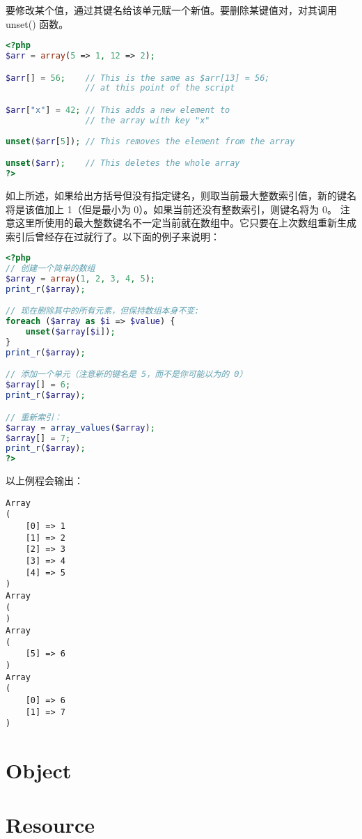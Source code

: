 要修改某个值，通过其键名给该单元赋一个新值。要删除某键值对，对其调用 unset() 函数。


\begin{lstlisting}[language=PHP]
<?php
$arr = array(5 => 1, 12 => 2);

$arr[] = 56;    // This is the same as $arr[13] = 56;
                // at this point of the script

$arr["x"] = 42; // This adds a new element to
                // the array with key "x"
                
unset($arr[5]); // This removes the element from the array

unset($arr);    // This deletes the whole array
?>
\end{lstlisting}

如上所述，如果给出方括号但没有指定键名，则取当前最大整数索引值，新的键名将是该值加上 1（但是最小为 0）。如果当前还没有整数索引，则键名将为 0。
注意这里所使用的最大整数键名不一定当前就在数组中。它只要在上次数组重新生成索引后曾经存在过就行了。以下面的例子来说明：

\begin{lstlisting}[language=PHP]
<?php
// 创建一个简单的数组
$array = array(1, 2, 3, 4, 5);
print_r($array);

// 现在删除其中的所有元素，但保持数组本身不变:
foreach ($array as $i => $value) {
    unset($array[$i]);
}
print_r($array);

// 添加一个单元（注意新的键名是 5，而不是你可能以为的 0）
$array[] = 6;
print_r($array);

// 重新索引：
$array = array_values($array);
$array[] = 7;
print_r($array);
?>
\end{lstlisting}

以上例程会输出：


\begin{verbatim}
Array
(
    [0] => 1
    [1] => 2
    [2] => 3
    [3] => 4
    [4] => 5
)
Array
(
)
Array
(
    [5] => 6
)
Array
(
    [0] => 6
    [1] => 7
)
\end{verbatim}



\section{Object}






\section{Resource}





